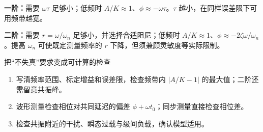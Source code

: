 \textbf{一阶：}需要 $\omega\tau$ 足够小；低频时 $A/K\approx1$、$\phi\approx-\omega\tau$。$\tau$ 越小，在同样误差限下可用频带越宽。

\textbf{二阶：}需要 $r=\omega/\omega_n$ 足够小，并选择合适阻尼；低频时 $A/K\approx1$、$\phi\approx-2\zeta\omega/\omega_n$。提高 $\omega_n$ 可使既定测量频率的 $r$ 下降，但须兼顾灵敏度等实际限制。

\begin{focusbox}{把“不失真”要求变成可计算的检查}
\begin{enumerate}
\item 写清频率范围、标定增益和误差限，检查频带内 $|A/K-1|$ 的最大值；二阶还需留意共振峰。
\item 波形测量检查相位对共同延迟的偏差 $\phi+\omega t_0$；同步测量直接检查相位差。
\item 检查共振附近的干扰、瞬态过载与级间负载，确认模型适用。
\end{enumerate}
\end{focusbox}

